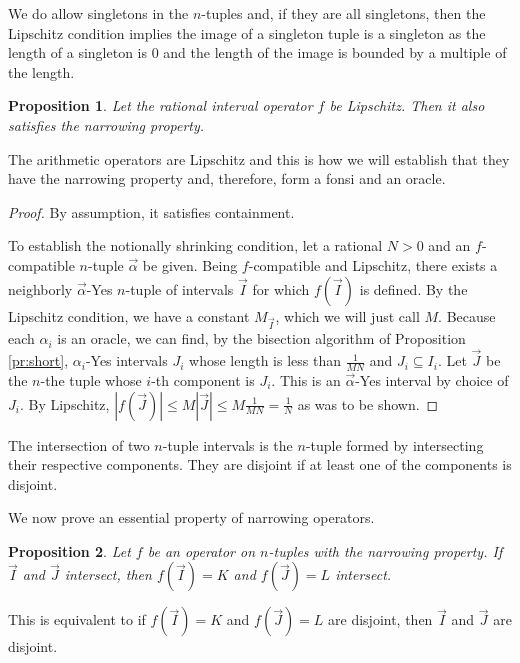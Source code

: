\documentclass[12pt]{article}
\newtheorem{proposition}{Proposition}[subsection]
\begin{document}
We do allow singletons in the $n$-tuples and, if they are all singletons, then the Lipschitz condition implies the image of a singleton tuple is a singleton as the length of a singleton is 0 and the length of the image is bounded by a multiple of the length. 

\begin{proposition}
    Let the rational interval operator $f$ be Lipschitz. Then it also satisfies the narrowing property. 
\end{proposition}

The arithmetic operators are Lipschitz and this is how we will establish that they have the narrowing property and, therefore, form a fonsi and an oracle. 

\begin{proof}
    By assumption, it satisfies containment. 

    To establish the notionally shrinking condition, let a rational $N >0$ and an $f$-compatible  $n$-tuple $\vec{\alpha}$ be given. Being $f$-compatible and Lipschitz, there exists a neighborly $\vec{\alpha}$-Yes $n$-tuple of intervals $\vec{I}$ for which $f(\vec{I})$ is defined. By the Lipschitz condition, we have a constant $M_{\vec{I}}$, which we will just call $M$. Because each $\alpha_i$ is an oracle, we can find, by the bisection algorithm of Proposition \ref{pr:short}, $\alpha_i$-Yes intervals $J_i$ whose length is less than $\frac{1}{MN}$ and $J_i \subseteq I_i$. Let $\vec{J}$ be the $n$-the tuple whose $i$-th component is $J_i$. This is an $\vec{\alpha}$-Yes interval by choice of $J_i$. By Lipschitz, $|f(\vec{J})| \leq M |\vec{J}| \leq M \frac{1}{MN} = \frac{1}{N}$ as was to be shown. 
\end{proof}


The intersection of two $n$-tuple intervals is the $n$-tuple formed by intersecting their respective components. They are disjoint if at least one of the components is disjoint. 

We now prove an essential property of narrowing operators. 

\begin{proposition} \label{pr:op-nrw}
Let $f$ be an operator on $n$-tuples with the narrowing property. If $\vec{I}$ and $\vec{J}$ intersect, then $f(\vec{I})=K$ and $f(\vec{J}) = L$ intersect.
\end{proposition}

This is equivalent to if $f(\vec{I})=K$ and $f(\vec{J}) = L$ are disjoint, then $\vec{I}$ and $\vec{J}$ are disjoint.
\end{document}
